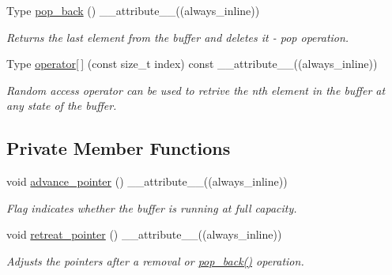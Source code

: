 \begin{DoxyCompactItemize}
Type \hyperlink{classCircular__Buffer_a0b7b0fb1ecffc75ba233fed043616313}{pop\+\_\+back} () \+\_\+\+\_\+attribute\+\_\+\+\_\+((always\+\_\+inline))
\begin{DoxyCompactList}\small\item\em Returns the last element from the buffer and deletes it -\/ pop operation. \end{DoxyCompactList}\item 
Type \hyperlink{classCircular__Buffer_a520f88f6e08b618a3b2923f157db541d}{operator\mbox{[}$\,$\mbox{]}} (const size\+\_\+t index) const \+\_\+\+\_\+attribute\+\_\+\+\_\+((always\+\_\+inline))
\begin{DoxyCompactList}\small\item\em Random access operator can be used to retrive the nth element in the buffer at any state of the buffer. \end{DoxyCompactList}\end{DoxyCompactItemize}
\subsection*{Private Member Functions}
\begin{DoxyCompactItemize}
\item 
void \hyperlink{classCircular__Buffer_a4ec86fd625e56d17abe155895cc4cc1b}{advance\+\_\+pointer} () \+\_\+\+\_\+attribute\+\_\+\+\_\+((always\+\_\+inline))
\begin{DoxyCompactList}\small\item\em Flag indicates whether the buffer is running at full capacity. \end{DoxyCompactList}\item 
void \hyperlink{classCircular__Buffer_a2b13869f0a5a4904142241a3d15ff141}{retreat\+\_\+pointer} () \+\_\+\+\_\+attribute\+\_\+\+\_\+((always\+\_\+inline))
\begin{DoxyCompactList}\small\item\em Adjusts the pointers after a removal or \hyperlink{classCircular__Buffer_a0b7b0fb1ecffc75ba233fed043616313}{pop\+\_\+back()} operation. \end{DoxyCompactList}\end{DoxyCompactItemize}
